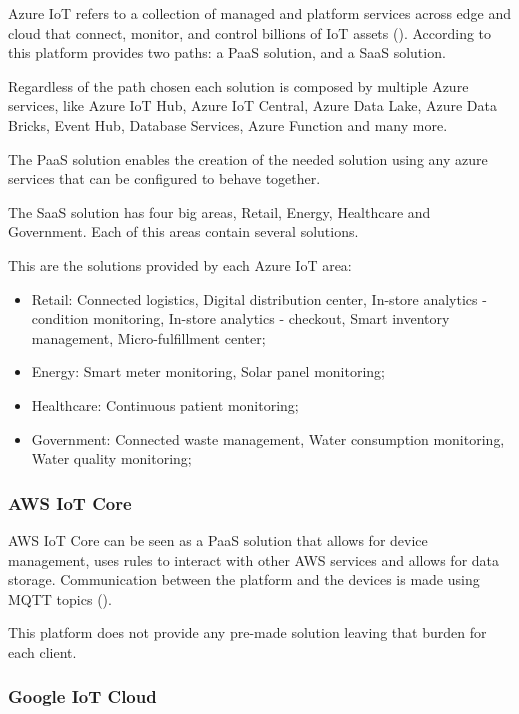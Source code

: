 Azure IoT refers to a collection of managed and platform services across edge and cloud that connect, monitor, and control billions of IoT assets (\cite{azure-iot}). According to \cite{pierleoni2019amazon} this platform provides two paths: a \gls{PaaS} solution, and a \gls{SaaS} solution.

Regardless of the path chosen each solution is composed by multiple Azure services, like Azure IoT Hub, Azure IoT Central, Azure Data Lake, Azure Data Bricks, Event Hub, Database Services, Azure Function and many more.

 The \gls{PaaS} solution enables the creation of the needed solution using any azure services that can be configured to behave together.

The \gls{SaaS} solution has four big areas, Retail, Energy, Healthcare and Government. Each of this areas contain several solutions.

This are the solutions provided by each Azure IoT area:

\begin{itemize}
    \item Retail: Connected logistics, Digital distribution center, In-store analytics - condition monitoring, In-store analytics - checkout, Smart inventory management, Micro-fulfillment center;
    \item Energy: Smart meter monitoring, Solar panel monitoring;
    \item Healthcare: Continuous patient monitoring;
    \item Government: Connected waste management, Water consumption monitoring, Water quality monitoring;
\end{itemize}

\subsubsection{AWS IoT Core}
\label{subsubsec:stateofart:iot:solutions:aws}

AWS IoT Core can be seen as a \gls{PaaS} solution that allows for device management, uses rules to interact with other AWS services and allows for data storage. Communication between the platform and the devices is made using \gls{MQTT} topics (\cite{pierleoni2019amazon}).

This platform does not provide any pre-made solution leaving that burden for each client.

\subsubsection{Google IoT Cloud}
\label{subsubsec:stateofart:iot:solutions:google}

